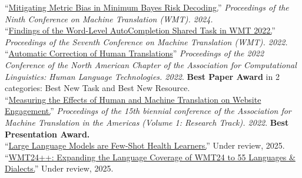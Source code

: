 
``\href{https://aclanthology.org/2024.wmt-1.109.pdf}{Mitigating Metric Bias in Minimum Bayes Risk Decoding.}'' \emph{Proceedings of the Ninth Conference on Machine Translation (WMT). 2024.}\\

``\href{https://aclanthology.org/2022.wmt-1.75.pdf}{Findings of the Word-Level AutoCompletion Shared Task in WMT 2022.}'' \emph{Proceedings of the Seventh Conference on Machine Translation (WMT). 2022.}\\

``\href{https://aclanthology.org/2022.naacl-main.36.pdf}{Automatic Correction of Human Translations}'' \emph{Proceedings of the 2022 Conference of the North American Chapter of the Association for Computational Linguistics: Human Language Technologies. 2022}. \textbf{Best Paper Award} in 2 categories: Best New Task and Best New Resource.\\

``\href{https://aclanthology.org/2022.amta-research.23.pdf}{Measuring the Effects of Human and Machine Translation on Website Engagement.}'' \emph{Proceedings of the 15th biennial conference of the Association for Machine Translation in the Americas (Volume 1: Research Track). 2022}. \textbf{Best Presentation Award.}\\

``\href{https://arxiv.org/pdf/2305.15525}{Large Language Models are Few-Shot Health Learners.}'' Under review, 2025.\\

``\href{https://arxiv.org/pdf/2502.12404}{WMT24++: Expanding the Language Coverage of WMT24 to 55 Languages \& Dialects.}'' Under review, 2025.\\

